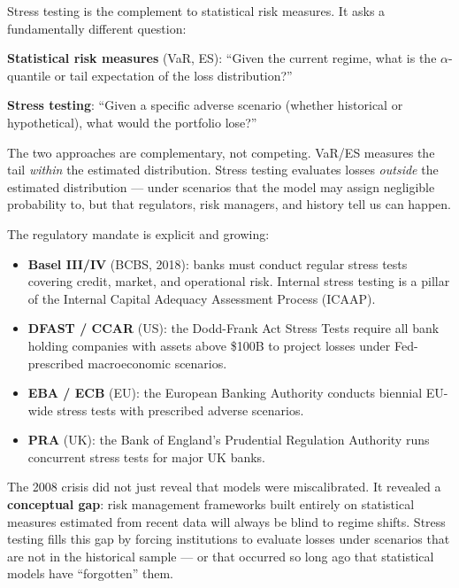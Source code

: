 \documentclass[11pt, a4paper]{article}
\theoremstyle{definition}
\theoremstyle{plain}
\theoremstyle{remark}
\begin{document}
Stress testing is the complement to statistical risk measures.
It asks a fundamentally different question:

\begin{keyidea}
\textbf{Statistical risk measures} (VaR, ES):
``Given the current regime, what is the $\alpha$-quantile or tail expectation of the loss distribution?''

\medskip

\textbf{Stress testing}:
``Given a specific adverse scenario (whether historical or hypothetical),
what would the portfolio lose?''

\medskip

The two approaches are complementary, not competing.
VaR/ES measures the tail \emph{within} the estimated distribution.
Stress testing evaluates losses \emph{outside} the estimated distribution ---
under scenarios that the model may assign negligible probability to,
but that regulators, risk managers, and history tell us can happen.
\end{keyidea}

The regulatory mandate is explicit and growing:

\begin{itemize}
    \item \textbf{Basel III/IV} (BCBS, 2018): banks must conduct regular stress tests
          covering credit, market, and operational risk.
          Internal stress testing is a pillar of the Internal Capital Adequacy Assessment Process (ICAAP).
    \item \textbf{DFAST / CCAR} (US): the Dodd-Frank Act Stress Tests require
          all bank holding companies with assets above \$100B to project losses
          under Fed-prescribed macroeconomic scenarios.
    \item \textbf{EBA / ECB} (EU): the European Banking Authority conducts
          biennial EU-wide stress tests with prescribed adverse scenarios.
    \item \textbf{PRA} (UK): the Bank of England's Prudential Regulation Authority
          runs concurrent stress tests for major UK banks.
\end{itemize}

\begin{warningbox}
The 2008 crisis did not just reveal that models were miscalibrated.
It revealed a \textbf{conceptual gap}: risk management frameworks built entirely on
statistical measures estimated from recent data will always be blind to regime shifts.
Stress testing fills this gap by forcing institutions to evaluate losses under scenarios
that are not in the historical sample --- or that occurred so long ago
that statistical models have ``forgotten'' them.
\end{warningbox}
\end{document}
